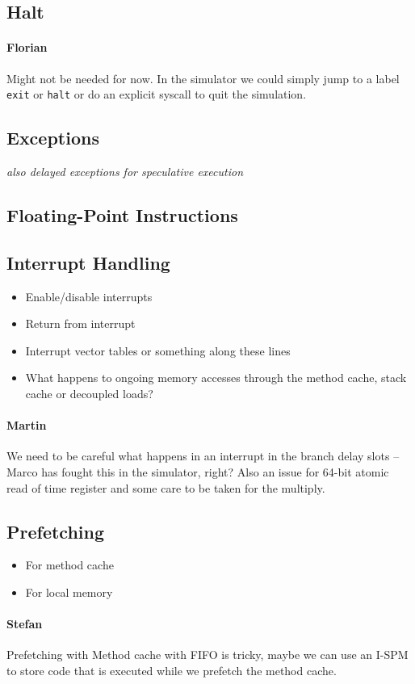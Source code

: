 \documentclass{IEEEtran}
\newcommand{\comment}[3]{\paragraph*{\textbf{#1}}{\color{#3}#2}}
\newcommand{\martin}[1]{\comment{Martin}{#1}{Blue}}
\newcommand{\stefan}[1]{\comment{Stefan}{#1}{RoyalPurple}}
\newcommand{\fb}[1]{\comment{Florian}{#1}{Emerald}}
\begin{document}
\subsection{Halt}
\fb{Might not be needed for now. In the simulator we could simply jump to a
label \texttt{exit} or \texttt{halt} or do an explicit syscall to quit the
simulation.}

\subsection{Exceptions}

\emph{also delayed exceptions for speculative execution}

\subsection{Floating-Point Instructions}

\subsection{Interrupt Handling}

\begin{itemize}
  \item Enable/disable interrupts
  \item Return from interrupt
  \item Interrupt vector tables or something along these lines
  \item What happens to ongoing memory accesses through the method cache, stack
        cache or decoupled loads?
\end{itemize}

\martin{We need to be careful what happens in an interrupt in the
branch delay slots -- Marco has fought this in the simulator, right?
Also an issue for 64-bit atomic read of time register and some
care to be taken for the multiply.}

\subsection{Prefetching}

\begin{itemize}
  \item For method cache
  \item For local memory
\end{itemize}

\stefan{Prefetching with Method cache with FIFO is tricky, maybe we can use an I-SPM to store code that is executed while we prefetch the
method cache.}
\end{document}
